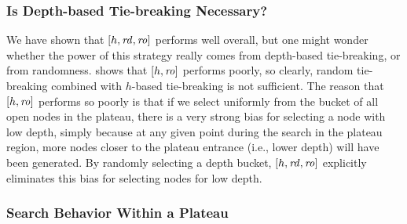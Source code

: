 
\subsubsection{Is Depth-based Tie-breaking Necessary?}

We have shown that $[h,\mbox{\textit{rd}},\mbox{\textit{ro}}]$ performs well overall, but
one might wonder whether the power of this strategy really comes from depth-based tie-breaking, or from randomness.
 shows that $[h,\mbox{\textit{ro}}]$ performs poorly, so clearly, random tie-breaking combined with $h$-based tie-breaking is not sufficient.
The reason that $[h,\mbox{\textit{ro}}]$ performs so poorly is that if we select uniformly from the bucket of all open nodes in the plateau, there is a very strong bias for selecting a node with low depth, simply because at any given point during the search in the plateau region, more nodes closer to the plateau entrance (i.e., lower depth) will have been generated.
By randomly selecting a depth bucket, $[h,\mbox{\textit{rd}},\mbox{\textit{ro}}]$ explicitly eliminates this bias for selecting nodes for low depth.



\subsubsection{Search Behavior Within a Plateau}

